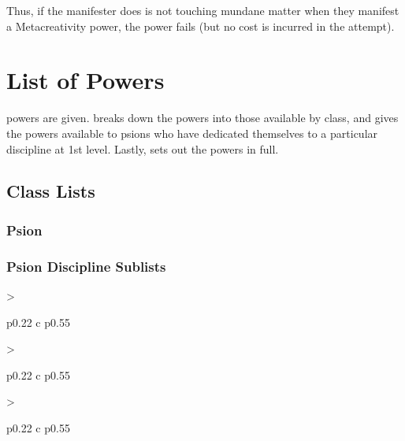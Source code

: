 Thus,
if the manifester does is not touching mundane matter
when they manifest a Metacreativity power,
the power fails (but no cost is incurred in the attempt).

\chapter{List of Powers}
\label{chap:list_of_powers}
powers are given.
 breaks down the powers into those
available by class,
and  gives the powers
available to psions who have dedicated themselves to a
particular discipline at 1st level.
Lastly,
 sets out the powers in full.

\section{Class Lists}
\label{sec:class_lists}
\DndSetThemeColor[DmgLavender]
\subsection{Psion}
\begin{dndlongtable}[
    >{\raggedright\arraybackslash}p{0.22\linewidth} c p{0.55\linewidth}]
    
\end{dndlongtable}

\subsection{Psion Discipline Sublists}
\label{sub:discipline_sublists}
\DndSetThemeColor[PhbLightCyan]
\begin{DndTable}[header=Prescience Sublist, bold=false]{
    >{\raggedright\arraybackslash}p{0.22\linewidth} c p{0.55\linewidth}}
    
\end{DndTable}

\DndSetThemeColor[PhbMauve]
\begin{DndTable}[header=Prana Bindu Sublist, bold=false]{
    >{\raggedright\arraybackslash}p{0.22\linewidth} c p{0.55\linewidth}}
    
\end{DndTable}

\DndSetThemeColor[PhbTan]
\begin{DndTable}[header=Voice Sublist, bold=false]{
    >{\raggedright\arraybackslash}p{0.22\linewidth} c p{0.55\linewidth}}
    
\end{DndTable}


